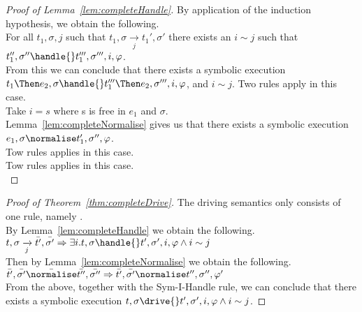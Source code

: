 \begin{proof}[Proof of Lemma~\ref{lem:completeHandle}]
{  By application of the induction hypothesis, we obtain the following.\\
  For all $t_1,\sigma,j$ such that $t_1,\sigma\xrightarrow[j]{}t_1',\sigma'$ there exists an $i\sim j$ such that $t_1'',\sigma''\handle{}t_1''',\sigma''',i,\phi$.\\
  From this we can conclude that there exists a symbolic execution $t_1\Then e_2,\sigma\handle{} t_1'''\Then e_2,\sigma''',i,\phi$, and $i\sim j$.
  }
  {
  Two rules apply in this case.\\
    {
      Take $i=s$ where s is free in $e_1$ and $\sigma$.\\
      Lemma~\ref{lem:completeNormalise} gives us that there exists a symbolic execution $e_1,\sigma\normalise t_1',\sigma'',\phi$.\\
    }
    {
    }
  }
    {
    Tow rules applies in this case.\\
    }
    {
    Tow rules applies in this case.\\
    }

\end{proof}



\begin{proof}[Proof of Theorem~\ref{thm:completeDrive}]
  The driving semantics only consists of one rule, namely .\\
  By Lemma~\ref{lem:completeHandle} we obtain the following.\\
  $t,\sigma\xrightarrow[j]{}\bar{t'},\bar{\sigma'}\implies \exists i . t,\sigma\handle{}t',\sigma',i,\phi \land i\sim j$\\
  Then by Lemma~\ref{lem:completeNormalise} we obtain the following.\\
  $\bar{t'},\bar{\sigma'}\bar{\normalise}\bar{t''},\bar{\sigma''}\implies \bar{t'},\bar{\sigma'}\normalise t'',\sigma'',\phi'$\\
  From the above, together with the Sym-I-Handle rule, we can conclude that there exists a symbolic execution $t,\sigma\drive{} t',\sigma',i,\phi\land i\sim j$.

\end{proof}
